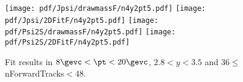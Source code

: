 \begin{figure}[H]
\begin{center}
\texttt{[image: pdf/Jpsi/drawmassF/n4y2pt5.pdf]}
\texttt{[image: pdf/Jpsi/2DFitF/n4y2pt5.pdf]}
\vspace*{-0.5cm}
\texttt{[image: pdf/Psi2S/drawmassF/n4y2pt5.pdf]}
\texttt{[image: pdf/Psi2S/2DFitF/n4y2pt5.pdf]}
\vspace*{-0.5cm}
\end{center}
\caption{Fit results in $8\gevc<\pt<20\gevc$, $2.8<y<3.5$ and 36$\leq$nForwardTracks$<$48.}
\label{Fitn4y2pt5}
\end{figure}
